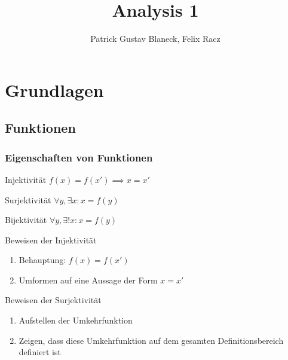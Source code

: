 \documentclass[german]{spicker}
\title{Analysis 1}
\author{Patrick Gustav Blaneck, Felix Racz}
\begin{document}
\maketitle
\tableofcontents
\newpage

\section{Grundlagen}
\subsection{Funktionen}
\subsubsection{Eigenschaften von Funktionen}
\begin{thirdboxl}
    \begin{defi}{Injektivität}
        $f(x) = f(x')\implies x = x'$
    \end{defi}
\end{thirdboxl}%
\begin{thirdboxm}
    \begin{defi}{Surjektivität}
        $\forall y, \exists x: x = f(y)$
    \end{defi}
\end{thirdboxm}%
\begin{thirdboxr}
    \begin{defi}{Bijektivität}
        $\forall y, \exists! x: x = f(y)$
    \end{defi}
\end{thirdboxr}%

\begin{algo}{Beweisen der Injektivität}
    \begin{enumerate}
        \item Behauptung: $f(x) = f(x')$
        \item Umformen auf eine Aussage der Form $x = x'$
    \end{enumerate}
\end{algo}

\begin{algo}{Beweisen der Surjektivität}
    \begin{enumerate}
        \item Aufstellen der Umkehrfunktion
        \item Zeigen, dass diese Umkehrfunktion auf dem gesamten Definitionsbereich definiert ist
    \end{enumerate}
\end{algo}
\end{document}
